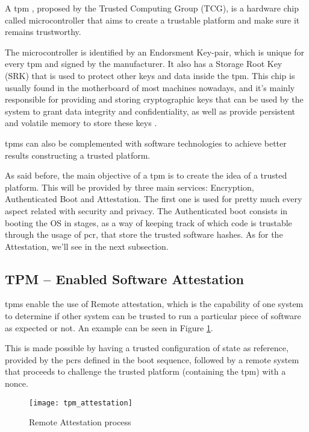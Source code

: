 A \gls{tpm} \cite{tpmPaper}, proposed by the Trusted Computing Group (TCG), is a hardware chip called microcontroller that aims to create a trustable platform and make sure it remains trustworthy.
 
The microcontroller is identified by an Endorsment Key-pair, which is unique for every \gls{tpm} and signed by the manufacturer. It also has a Storage Root Key (SRK) that is used to protect other keys and data inside the \gls{tpm}. 
This chip is usually found in the motherboard of most machines nowadays, and it's mainly responsible for providing and storing cryptographic keys that can be used by the system to grant data integrity and confidentiality, as well as provide persistent and volatile memory to store these keys \cite{sgxCloudThesis}.

\gls{tpm}s can also be complemented with software technologies to achieve better results constructing a trusted platform. 

As said before, the main objective of a \gls{tpm} is to create the idea of a trusted platform. This will be  provided by three main services: Encryption, Authenticated Boot and Attestation. The first one is used for pretty much every aspect related with security and privacy. The Authenticated boot consists in booting the OS in stages, as a way of keeping track of which code is trustable through the usage of \gls{pcr}, that store the trusted software hashes. As for the Attestation, we'll see in the next subsection.


\subsection{TPM – Enabled Software Attestation}
\label{ssec:tpm_attest}

\gls{tpm}s enable the use of Remote attestation, which is the capability of one system to determine if other system can be trusted to run a particular piece of software as expected or not. An example can be seen in Figure \ref{fig:tpm_attestation}.

This is made possible by having a trusted configuration of state as reference, provided by the \gls{pcr}s defined in the boot sequence, followed by a remote system that proceeds to challenge the trusted platform (containing the \gls{tpm}) with a nonce. 

\begin{figure}[htbp]
	\centering
	{\texttt{[image: tpm\_attestation]}}%
	\caption{Remote Attestation process}
	\label{fig:tpm_attestation}
\end{figure}

